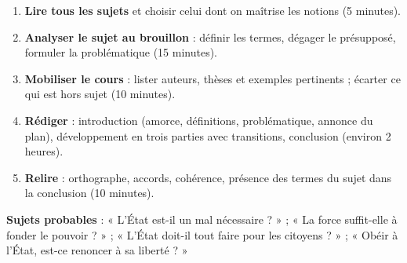 \documentclass[11pt]{article}
\begin{document}
\begin{methode}
\begin{enumerate}
\item \textbf{Lire tous les sujets} et choisir celui dont on maîtrise les notions (5 minutes).
\item \textbf{Analyser le sujet au brouillon} : définir les termes, dégager le présupposé, formuler la problématique (15 minutes).
\item \textbf{Mobiliser le cours} : lister auteurs, thèses et exemples pertinents ; écarter ce qui est hors sujet (10 minutes).
\item \textbf{Rédiger} : introduction (amorce, définitions, problématique, annonce du plan), développement en trois parties avec transitions, conclusion (environ 2 heures).
\item \textbf{Relire} : orthographe, accords, cohérence, présence des termes du sujet dans la conclusion (10 minutes).
\end{enumerate}
\textbf{Sujets probables} : « L'État est-il un mal nécessaire ? » ; « La force suffit-elle à fonder le pouvoir ? » ; « L'État doit-il tout faire pour les citoyens ? » ; « Obéir à l'État, est-ce renoncer à sa liberté ? »
\end{methode}
\end{document}
